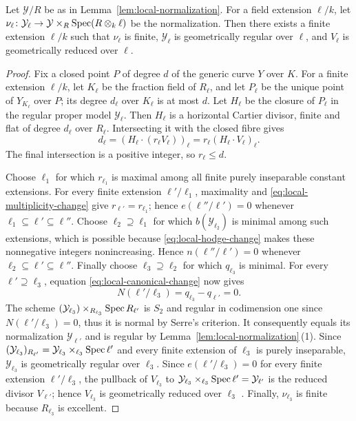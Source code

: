 \begin{proposition}\label{prop:local-normalization-stabilization}
Let $\mathcal Y/R$ be as in Lemma~\ref{lem:local-normalization}.
For a field extension $\ell/k$, let $\nu_{\ell}\colon \mathcal Y_{\ell} \to \mathcal Y\times_R\operatorname{Spec}(R\otimes_k\ell)$ be the normalization.
Then there exists a finite extension $\ell/k$ such that $\nu_{\ell}$ is finite, $\mathcal Y_{\ell}$ is geometrically regular over $\ell$, and $V_{\ell}$ is geometrically reduced over $\ell$.
\end{proposition}

\begin{proof}
Fix a closed point $P$ of degree $d$ of the generic curve $Y$ over $K$.
For a finite extension $\ell/k$, let $K_{\ell}$ be the fraction field of $R_{\ell}$, and let $P_{\ell}$ be the unique point of $Y_{K_{\ell}}$ over $P$; its degree $d_{\ell}$ over $K_{\ell}$ is at most $d$.
Let $H_{\ell}$ be the closure of $P_{\ell}$ in the regular proper model $\mathcal Y_{\ell}$.
Then $H_{\ell}$ is a horizontal Cartier divisor, finite and flat of degree $d_{\ell}$ over $R_{\ell}$.
Intersecting it with the closed fibre gives
\[
  d_{\ell} = (H_{\ell}\cdot(r_{\ell}V_{\ell}))_{\ell} = r_{\ell}(H_{\ell}\cdot V_{\ell})_{\ell}.
\]
The final intersection is a positive integer, so $r_{\ell}\leq d$.

Choose $\ell_1$ for which $r_{\ell_1}$ is maximal among all finite purely inseparable constant extensions.
For every finite extension $\ell'/\ell_1$, maximality and \eqref{eq:local-multiplicity-change} give $r_{\ell'} = r_{\ell_1}$; hence $e(\ell''/\ell') = 0$ whenever $\ell_1\subseteq\ell'\subseteq\ell''$.
Choose $\ell_2\supseteq \ell_1$ for which $b(\mathcal Y_{\ell_2})$ is minimal among such extensions, which is possible because \eqref{eq:local-hodge-change} makes these nonnegative integers nonincreasing.
Hence $n(\ell''/\ell') = 0$ whenever $\ell_2\subseteq\ell'\subseteq\ell''$.
Finally choose $\ell_3\supseteq \ell_2$ for which $q_{\ell_3}$ is minimal.
For every $\ell'\supseteq \ell_3$, equation \eqref{eq:local-canonical-change} now gives
\[
  N(\ell'/\ell_3)=q_{\ell_3}-q_{\ell'}=0.
\]
The scheme $(\mathcal Y_{\ell_3}) \times_{R_{\ell_3}} \operatorname{Spec} R_{\ell'}$ is $S_2$ and regular in codimension one since $N(\ell'/\ell_3) = 0$, thus it is normal by Serre's criterion.
It consequently equals its normalization $\mathcal Y_{\ell'}$ and is regular by Lemma~\ref{lem:local-normalization}\,(1).
Since $(\mathcal Y_{\ell_3})_{R_{\ell'}} = \mathcal Y_{\ell_3}\times_{\ell_3}\operatorname{Spec}\ell'$ and every finite extension of $\ell_3$ is purely inseparable, $\mathcal Y_{\ell_3}$ is geometrically regular over $\ell_3$.
Since $e(\ell'/\ell_3) = 0$ for every finite extension $\ell'/\ell_3$, the pullback of $V_{\ell_3}$ to $\mathcal Y_{\ell_3}\times_{\ell_3}\operatorname{Spec}\ell' = \mathcal Y_{\ell'}$ is the reduced divisor $V_{\ell'}$; hence $V_{\ell_3}$ is geometrically reduced over $\ell_3$ \cite[Tag~]{Stacks}.
Finally, $\nu_{\ell_3}$ is finite because $R_{\ell_3}$ is excellent.
\end{proof}

